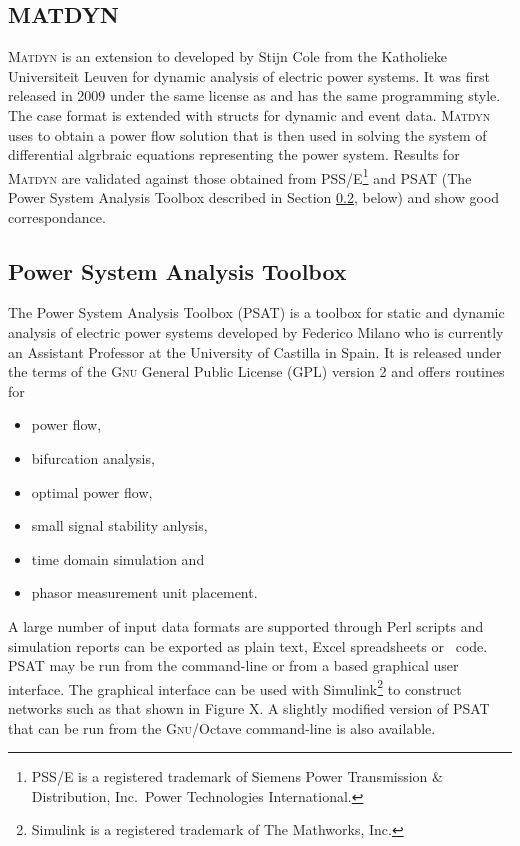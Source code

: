 \subsection{MATDYN}
\textsc{Matdyn} is an extension to \matpower developed by Stijn Cole from the
Katholieke Universiteit Leuven for dynamic analysis of electric power systems.
It was first released in 2009 under the same license as \matpower and has the
same programming style.  The \matpower case format is extended with structs
for dynamic and event data.  \textsc{Matdyn} uses \matpower to obtain a power
flow solution that is then used in solving the system of differential
algrbraic equations representing the power system.  Results for \textsc{Matdyn}
are validated against those obtained from PSS/E\footnote{PSS/E is a
registered trademark of Siemens Power Transmission \& Distribution, Inc.~Power
Technologies International.} and PSAT (The Power System Analysis Toolbox
described in Section \ref{sec:psat}, below) and show good correspondance.

\subsection{Power System Analysis Toolbox}
\label{sec:psat}
The Power System Analysis Toolbox (PSAT) is a \matlab toolbox for static and
dynamic analysis of electric power systems developed by Federico Milano
who is currently an Assistant Professor at the University of Castilla in Spain.
It is released under the terms of the \textsc{Gnu} General Public License (GPL)
version 2 and offers routines for
\begin{itemize}
	\item power flow,
	\item bifurcation analysis,
	\item optimal power flow,
	\item small signal stability anlysis,
	\item time domain simulation and
	\item phasor measurement unit placement.
\end{itemize}
A large number of input data formats are supported through Perl scripts and
simulation reports can be exported as plain text, Excel spreadsheets or
\LaTeXe~code.  PSAT may be run from the \matlab command-line or from a \matlab
based graphical user interface.  The graphical interface can be used with
Simulink\footnote{Simulink is a registered trademark of The Mathworks, Inc.}
to construct networks such as that shown in Figure X.  A slightly modified
version of PSAT that can be run from the \textsc{Gnu}/Octave command-line is
also available.

